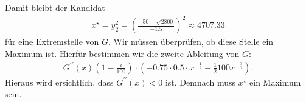 Damit bleibt der Kandidat 
\begin{align*}
	x^\star = y_2^2 = 
	\left(\frac{-50 - \sqrt{2800}}{-1.5}\right)^2
	\approx
	4707.33
\end{align*}
für eine Extremstelle von $ G $. Wir müssen überprüfen, ob diese Stelle ein Maximum ist.
Hierfür bestimmen wir die zweite Ableitung von $ G $:
\begin{align*}
	G^{\prime \prime}(x)
	\left(1 - \frac{i}{100}\right)\cdot 
	\left(
	-0.75 \cdot 0.5\cdot x^{- \frac{1}{2}} - \frac{1}{2} 100 x^{- \frac{3}{2}}
	\right).
\end{align*}
Hieraus wird ersichtlich, dass $ G^{\prime \prime}(x) < 0 $ ist.
Demnach muss $ x^\star $ ein Maximum sein.



